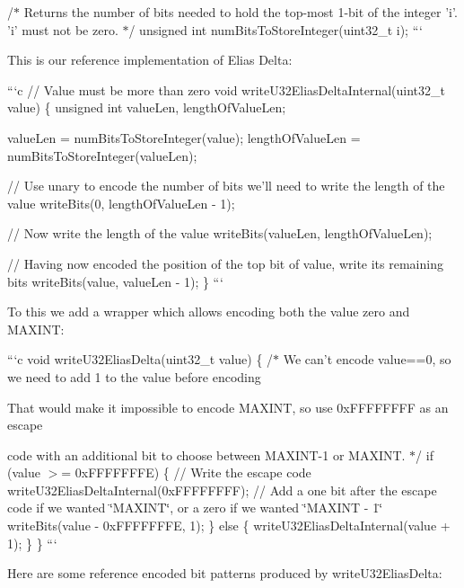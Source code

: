/$\ast$ Returns the number of bits needed to hold the top-\/most 1-\/bit of the integer 'i'. 'i' must not be zero. $\ast$/ unsigned int num\+Bits\+To\+Store\+Integer(uint32\+\_\+t i); ```

This is our reference implementation of Elias Delta\+:

```c // Value must be more than zero void write\+U32\+Elias\+Delta\+Internal(uint32\+\_\+t value) \{ unsigned int value\+Len, length\+Of\+Value\+Len;

value\+Len = num\+Bits\+To\+Store\+Integer(value); length\+Of\+Value\+Len = num\+Bits\+To\+Store\+Integer(value\+Len);

// Use unary to encode the number of bits we'll need to write the length of the value write\+Bits(0, length\+Of\+Value\+Len -\/ 1);

// Now write the length of the value write\+Bits(value\+Len, length\+Of\+Value\+Len);

// Having now encoded the position of the top bit of value, write its remaining bits write\+Bits(value, value\+Len -\/ 1); \} ```

To this we add a wrapper which allows encoding both the value zero and M\+A\+X\+I\+N\+T\+:

```c void write\+U32\+Elias\+Delta(uint32\+\_\+t value) \{ /$\ast$ We can't encode value==0, so we need to add 1 to the value before encoding
\begin{DoxyItemize}
\item 
\item That would make it impossible to encode M\+A\+X\+I\+N\+T, so use 0x\+F\+F\+F\+F\+F\+F\+F\+F as an escape
\item code with an additional bit to choose between M\+A\+X\+I\+N\+T-\/1 or M\+A\+X\+I\+N\+T. $\ast$/ if (value $>$= 0x\+F\+F\+F\+F\+F\+F\+F\+E) \{ // Write the escape code write\+U32\+Elias\+Delta\+Internal(0x\+F\+F\+F\+F\+F\+F\+F\+F); // Add a one bit after the escape code if we wanted \char`\"{}\+M\+A\+X\+I\+N\+T\char`\"{}, or a zero if we wanted \char`\"{}\+M\+A\+X\+I\+N\+T -\/ 1\char`\"{} write\+Bits(value -\/ 0x\+F\+F\+F\+F\+F\+F\+F\+E, 1); \} else \{ write\+U32\+Elias\+Delta\+Internal(value + 1); \} \} ```
\end{DoxyItemize}

Here are some reference encoded bit patterns produced by write\+U32\+Elias\+Delta\+:

